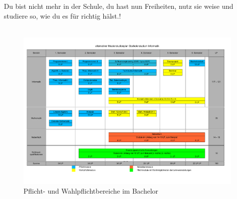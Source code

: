 Du bist nicht mehr in der Schule, du hast nun Freiheiten, nutz sie weise und studiere so, wie du es für richtig hälst.!\\\\

\begin{figure}[p] 
  			\includegraphics[angle=90, totalheight=\textheight, width=\textwidth ]
{bilder/studienplan_bsc_ws/studienplan_bsc}
		\caption{Pflicht- und Wahlpflichtbereiche im Bachelor}
\end{figure}
